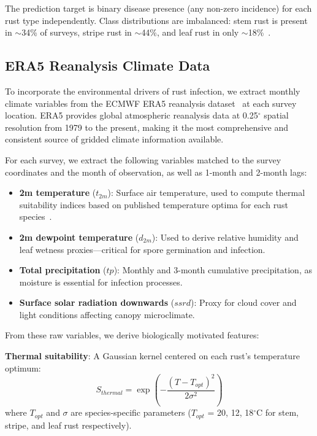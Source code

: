 \documentclass[10pt,twocolumn,letterpaper]{article}
\begin{document}
The prediction target is binary disease presence (any non-zero incidence) for each rust type independently. Class distributions are imbalanced: stem rust is present in ${\sim}$34\% of surveys, stripe rust in ${\sim}$44\%, and leaf rust in only ${\sim}$18\%~\cite{meyer2021}.

\subsection{ERA5 Reanalysis Climate Data}
\label{sec:era5}

To incorporate the environmental drivers of rust infection, we extract monthly climate variables from the ECMWF ERA5 reanalysis dataset~\cite{era5} at each survey location. ERA5 provides global atmospheric reanalysis data at 0.25$^\circ$ spatial resolution from 1979 to the present, making it the most comprehensive and consistent source of gridded climate information available.

For each survey, we extract the following variables matched to the survey coordinates and the month of observation, as well as 1-month and 2-month lags:

\begin{itemize}
\item \textbf{2m temperature} ($t_{2m}$): Surface air temperature, used to compute thermal suitability indices based on published temperature optima for each rust species~\cite{roelfs1992}.
\item \textbf{2m dewpoint temperature} ($d_{2m}$): Used to derive relative humidity and leaf wetness proxies---critical for spore germination and infection.
\item \textbf{Total precipitation} ($tp$): Monthly and 3-month cumulative precipitation, as moisture is essential for infection processes.
\item \textbf{Surface solar radiation downwards} ($ssrd$): Proxy for cloud cover and light conditions affecting canopy microclimate.
\end{itemize}

From these raw variables, we derive biologically motivated features:

\noindent\textbf{Thermal suitability}: A Gaussian kernel centered on each rust's temperature optimum:
\begin{equation}
S_{thermal} = \exp\left(-\frac{(T - T_{opt})^2}{2\sigma^2}\right)
\label{eq:thermal}
\end{equation}
where $T_{opt}$ and $\sigma$ are species-specific parameters ($T_{opt}$ = 20, 12, 18$^\circ$C for stem, stripe, and leaf rust respectively).
\end{document}
